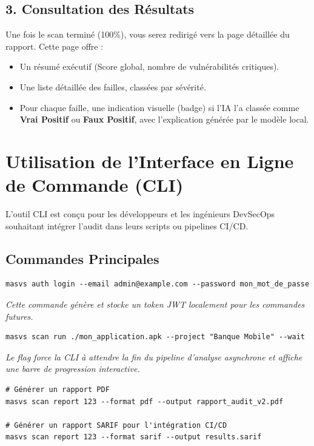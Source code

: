 \subsection{3. Consultation des Résultats}
Une fois le scan terminé (100\%), vous serez redirigé vers la page détaillée du rapport. Cette page offre :
\begin{itemize}
    \item Un résumé exécutif (Score global, nombre de vulnérabilités critiques).
    \item Une liste détaillée des failles, classées par sévérité.
    \item Pour chaque faille, une indication visuelle (badge) si l'IA l'a classée comme \textbf{Vrai Positif} ou \textbf{Faux Positif}, avec l'explication générée par le modèle local.
\end{itemize}

\section{Utilisation de l'Interface en Ligne de Commande (CLI)}
L'outil CLI est conçu pour les développeurs et les ingénieurs DevSecOps souhaitant intégrer l'audit dans leurs scripts ou pipelines CI/CD.

\subsection{Commandes Principales}

\begin{tcolorbox}[codebox, title={Authentification}]
\begin{verbatim}
masvs auth login --email admin@example.com --password mon_mot_de_passe
\end{verbatim}
\textit{Cette commande génère et stocke un token JWT localement pour les commandes futures.}
\end{tcolorbox}

\begin{tcolorbox}[codebox, title={Lancement d'un Scan Automatisé}]
\begin{verbatim}
masvs scan run ./mon_application.apk --project "Banque Mobile" --wait
\end{verbatim}
\textit{Le flag  force la CLI à attendre la fin du pipeline d'analyse asynchrone et affiche une barre de progression interactive.}
\end{tcolorbox}

\begin{tcolorbox}[codebox, title={Génération de Rapports}]
\begin{verbatim}
# Générer un rapport PDF
masvs scan report 123 --format pdf --output rapport_audit_v2.pdf

# Générer un rapport SARIF pour l'intégration CI/CD
masvs scan report 123 --format sarif --output results.sarif
\end{verbatim}
\end{tcolorbox}

\cleardoublepage

